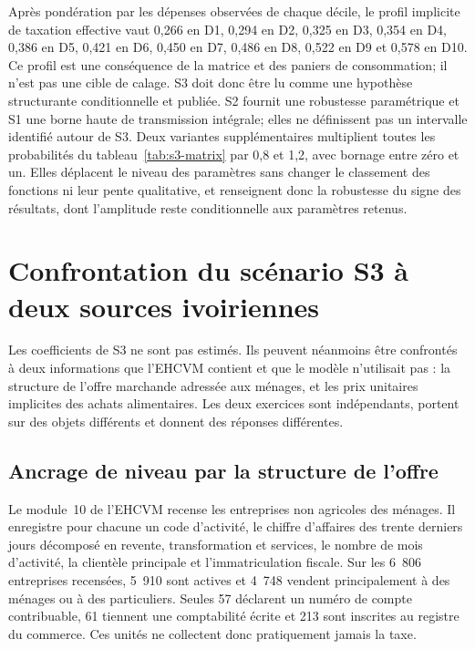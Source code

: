 \documentclass[11pt,a4paper]{article}
\begin{document}
Après pondération par les dépenses observées de chaque décile, le profil
implicite de taxation effective vaut 0,266 en D1, 0,294 en D2, 0,325 en D3,
0,354 en D4, 0,386 en D5, 0,421 en D6, 0,450 en D7, 0,486 en D8, 0,522 en D9
et 0,578 en D10. Ce profil est une conséquence de la matrice et des paniers de
consommation; il n'est pas une cible de calage. S3 doit donc être lu comme une
hypothèse structurante conditionnelle et publiée. S2 fournit une robustesse
paramétrique et S1 une borne haute de transmission intégrale; elles ne définissent
pas un intervalle identifié autour de S3. Deux variantes supplémentaires
multiplient toutes les probabilités du tableau~\ref{tab:s3-matrix} par 0,8 et
1,2, avec bornage entre zéro et un. Elles déplacent le niveau des paramètres
sans changer le classement des fonctions ni leur pente qualitative, et
renseignent donc la robustesse du signe des résultats, dont l'amplitude reste
conditionnelle aux paramètres retenus.
\clearpage

\section{Confrontation du scénario S3 à deux sources ivoiriennes}
\label{annexe:ancrage}

Les coefficients de S3 ne sont pas estimés. Ils peuvent néanmoins être confrontés
à deux informations que l'EHCVM contient et que le modèle n'utilisait pas :
la structure de l'offre marchande adressée aux ménages, et les prix unitaires
implicites des achats alimentaires. Les deux exercices sont indépendants, portent
sur des objets différents et donnent des réponses différentes.

\subsection{Ancrage de niveau par la structure de l'offre}

Le module~10 de l'EHCVM recense les entreprises non agricoles des ménages. Il
enregistre pour chacune un code d'activité, le chiffre d'affaires des trente
derniers jours décomposé en revente, transformation et services, le nombre de
mois d'activité, la clientèle principale et l'immatriculation fiscale. Sur les
6~806 entreprises recensées, 5~910 sont actives et 4~748 vendent principalement
à des ménages ou à des particuliers. Seules 57 déclarent un numéro de compte
contribuable, 61 tiennent une comptabilité écrite et 213 sont inscrites au
registre du commerce. Ces unités ne collectent donc pratiquement jamais la taxe.
\end{document}
